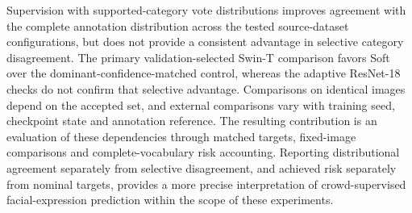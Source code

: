 Supervision with supported-category vote distributions improves agreement with the complete annotation distribution across the tested source-dataset configurations, but does not provide a consistent advantage in selective category disagreement. The primary validation-selected Swin-T comparison favors Soft over the dominant-confidence-matched control, whereas the adaptive ResNet-18 checks do not confirm that selective advantage. Comparisons on identical images depend on the accepted set, and external comparisons vary with training seed, checkpoint state and annotation reference. The resulting contribution is an evaluation of these dependencies through matched targets, fixed-image comparisons and complete-vocabulary risk accounting. Reporting distributional agreement separately from selective disagreement, and achieved risk separately from nominal targets, provides a more precise interpretation of crowd-supervised facial-expression prediction within the scope of these experiments.

